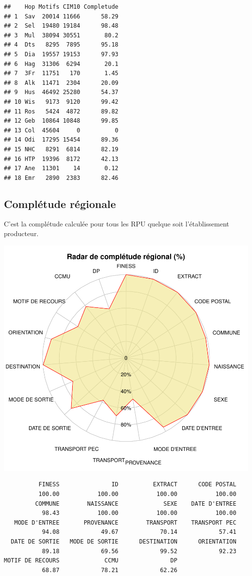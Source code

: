 \documentclass[]{article}
\begin{document}
\begin{verbatim}
##    Hop Motifs CIM10 Completude
## 1  Sav  20014 11666      58.29
## 2  Sel  19480 19184      98.48
## 3  Mul  38094 30551       80.2
## 4  Dts   8295  7895      95.18
## 5  Dia  19557 19153      97.93
## 6  Hag  31306  6294       20.1
## 7  3Fr  11751   170       1.45
## 8  Alk  11471  2304      20.09
## 9  Hus  46492 25280      54.37
## 10 Wis   9173  9120      99.42
## 11 Ros   5424  4872      89.82
## 12 Geb  10864 10848      99.85
## 13 Col  45604     0          0
## 14 Odi  17295 15454      89.36
## 15 NHC   8291  6814      82.19
## 16 HTP  19396  8172      42.13
## 17 Ane  11301    14       0.12
## 18 Emr   2890  2383      82.46
\end{verbatim}

\subsection{Complétude régionale}\label{completude-regionale}

C'est la complétude calculée pour tous les RPU quelque soit
l'établissement producteur.

\includegraphics{completude_files/figure-latex/comp_regionale-1.pdf}

\begin{verbatim}
          FINESS               ID          EXTRACT      CODE POSTAL 
          100.00           100.00           100.00           100.00 
         COMMUNE        NAISSANCE             SEXE    DATE D'ENTREE 
           98.43           100.00           100.00           100.00 
   MODE D'ENTREE       PROVENANCE        TRANSPORT    TRANSPORT PEC 
           94.08            49.67            70.14            57.41 
  DATE DE SORTIE   MODE DE SORTIE      DESTINATION      ORIENTATION 
           89.18            69.56            99.52            92.23 
MOTIF DE RECOURS             CCMU               DP 
           68.87            78.21            62.26 
\end{verbatim}
\end{document}
